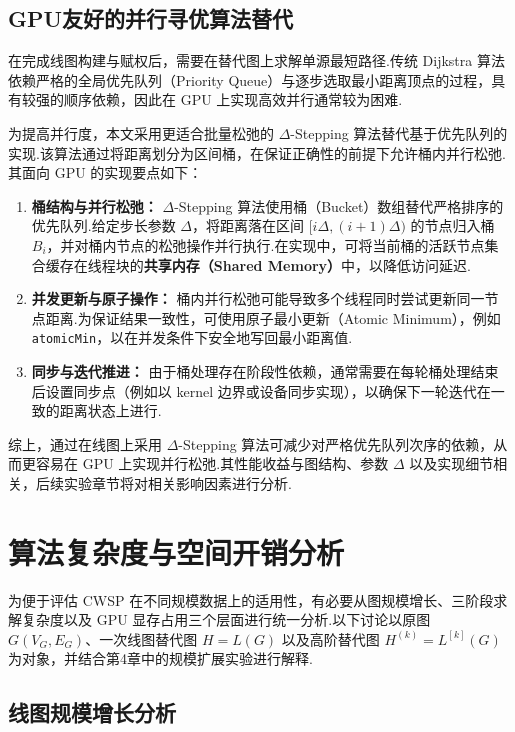\subsection{GPU友好的并行寻优算法替代}

在完成线图构建与赋权后，需要在替代图上求解单源最短路径.传统 Dijkstra 算法依赖严格的全局优先队列（Priority Queue）与逐步选取最小距离顶点的过程，具有较强的顺序依赖，因此在 GPU 上实现高效并行通常较为困难.

为提高并行度，本文采用更适合批量松弛的 $\Delta$-Stepping 算法替代基于优先队列的实现.该算法通过将距离划分为区间桶，在保证正确性的前提下允许桶内并行松弛.其面向 GPU 的实现要点如下：
\begin{enumerate}
    \item \textbf{桶结构与并行松弛：} $\Delta$-Stepping 算法使用桶（Bucket）数组替代严格排序的优先队列.给定步长参数 $\Delta$，将距离落在区间 $[i\Delta, (i+1)\Delta)$ 的节点归入桶 $B_i$，并对桶内节点的松弛操作并行执行.在实现中，可将当前桶的活跃节点集合缓存在线程块的\textbf{共享内存（Shared Memory）}中，以降低访问延迟.
    \item \textbf{并发更新与原子操作：} 桶内并行松弛可能导致多个线程同时尝试更新同一节点距离.为保证结果一致性，可使用原子最小更新（Atomic Minimum），例如 \texttt{atomicMin}，以在并发条件下安全地写回最小距离值.
    \item \textbf{同步与迭代推进：} 由于桶处理存在阶段性依赖，通常需要在每轮桶处理结束后设置同步点（例如以 kernel 边界或设备同步实现），以确保下一轮迭代在一致的距离状态上进行.
\end{enumerate}

综上，通过在线图上采用 $\Delta$-Stepping 算法可减少对严格优先队列次序的依赖，从而更容易在 GPU 上实现并行松弛.其性能收益与图结构、参数 $\Delta$ 以及实现细节相关，后续实验章节将对相关影响因素进行分析.

\section{算法复杂度与空间开销分析}

为便于评估 CWSP 在不同规模数据上的适用性，有必要从图规模增长、三阶段求解复杂度以及 GPU 显存占用三个层面进行统一分析.以下讨论以原图 $G(V_G,E_G)$、一次线图替代图 $H=L(G)$ 以及高阶替代图 $H^{(k)}=L^{[k]}(G)$ 为对象，并结合第4章中的规模扩展实验进行解释.

\subsection{线图规模增长分析}

